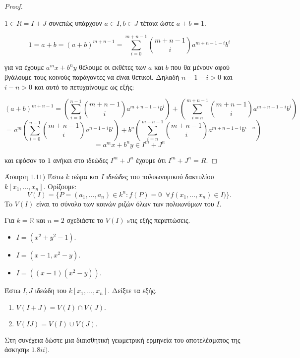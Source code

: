 \documentclass[oneside,a4paper]{article}
\begin{document}
\begin{proof} $ $

	$ $\newline $ 1 \in R = I + J$ συνεπώς υπάρχουν $a \in I, b \in J$ τέτοια ώστε $a+b=1$.

	$$1= a + b = (a+b)^{m+n-1} = \sum\limits_{i=0}^{m+n-1} \binom{m+n-1}{i} a^{m+n-1-i} b^i$$

	για να έχουμε $a^m x + b^n y$ θέλουμε οι εκθέτες των $a$ και $b$ που θα μένουν αφού βγάλουμε τους κοινούς παράγοντες να είναι θετικοί. Δηλαδή $n-1-i>0$ και $i-n>0$ και αυτό το πετυχαίνουμε ως εξής:

	$$(a+b)^{m+n-1} = \left(\sum\limits_{i=0}^{n-1} \binom{m+n-1}{i} a^{m+n-1-i} b^i \right) + \left(\sum\limits_{i=n}^{m+n-1} \binom{m+n-1}{i} a^{m+n-1-i} b^i \right)$$
	$$ = a^m \left(\sum\limits_{i=0}^{n-1} \binom{m+n-1}{i} a^{n-1-i} b^i \right) + b^n \left(\sum\limits_{i=n}^{m+n-1} \binom{m+n-1}{i} a^{m+n-1-i} b^{i-n} \right) $$
	$$= a^m x + b^n y \in I^m + J^n $$

	και εφόσον το $1$ ανήκει στο ιδεώδες $I^m + J^n$ έχουμε ότι $I^m + J^n = R$.
\end{proof}
\pagebreak

\noindent Άσκηση $1.11)$
\quad Έστω $k$ σώμα και $I$ ιδεώδες του πολυωνυμικού δακτυλίου $k[x_1,...,x_n]$. Ορίζουμε: $$V(I)= \{P=(a_1,...,a_n) \in k^n: f(P)=0 \;\; \forall f(x_1,...,x_n) \in I)\}.$$ 
To $V(I)$ είναι το σύνολο των κοινών ριζών όλων των πολυωνύμων του $I$.


Για $k=\mathbb{R}$ και $n=2$ σχεδιάστε το $V(I)$ sτις εξής περιπτώσεις.
\begin{itemize}
	\item	   $I=(x^2+y^2-1)$.
	\item	   $I=(x-1, x^2-y)$.
	\item	  $I=((x-1)(x^2-y))$.

\end{itemize}


Έστω $I, J$ ιδεώδη του $k[x_1,...,x_n]$. Δείξτε τα εξής.
\begin{enumerate}
	\item	  $V(I+J)=V(I)\cap V(J). $
	\item	  $V(IJ)=V(I)\cup V(J). $
\end{enumerate}

Στη συνέχεια δώστε μια διαισθητική γεωμετρική ερμηνεία του αποτελέσματος της άσκησηs $1.8ii)$.
\end{document}
